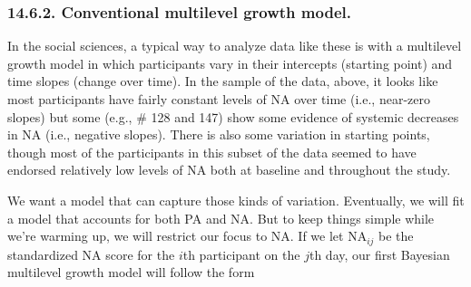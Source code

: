 \documentclass[]{article}
\begin{document}
\hypertarget{conventional-multilevel-growth-model.}{%
\subsubsection{14.6.2. Conventional multilevel growth
model.}\label{conventional-multilevel-growth-model.}}

In the social sciences, a typical way to analyze data like these is with
a multilevel growth model in which participants vary in their intercepts
(starting point) and time slopes (change over time). In the sample of
the data, above, it looks like most participants have fairly constant
levels of NA over time (i.e., near-zero slopes) but some (e.g., \# 128
and 147) show some evidence of systemic decreases in NA (i.e., negative
slopes). There is also some variation in starting points, though most of
the participants in this subset of the data seemed to have endorsed
relatively low levels of NA both at baseline and throughout the study.

We want a model that can capture those kinds of variation. Eventually,
we will fit a model that accounts for both PA and NA. But to keep things
simple while we're warming up, we will restrict our focus to NA. If we
let \(\text{NA}_{ij}\) be the standardized NA score for the \(i\)th
participant on the \(j\)th day, our first Bayesian multilevel growth
model will follow the form
\end{document}

